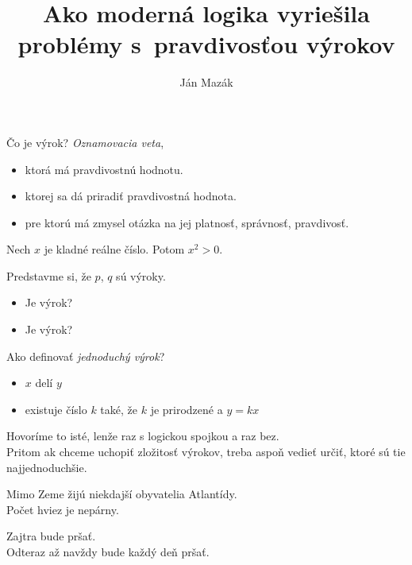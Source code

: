 \documentclass[12pt]{beamer}
\theoremstyle{definition}
\begin{document}
	\title{Ako moderná logika vyriešila problémy s~pravdivosťou výrokov}
	\author{Ján Mazák}
	\frame{\titlepage}

\begin{frame}
Čo je výrok? \emph{Oznamovacia veta},
\begin{itemize}
	\item ktorá má pravdivostnú hodnotu.
	\item ktorej sa dá priradiť pravdivostná hodnota.
	\item pre ktorú má zmysel otázka na jej platnosť, správnosť, pravdivosť.
\end{itemize}
\end{frame}

\begin{frame}
Nech $x$ je kladné reálne číslo. Potom $x^2 > 0$.
\end{frame}

\begin{frame}
Predstavme si, že $p$, $q$ sú výroky.
\begin{itemize}
	\item Je  výrok?
	\item Je  výrok?
\end{itemize}
\end{frame}

\begin{frame}
Ako definovať \emph{jednoduchý výrok}? 
\begin{itemize}
	\item $x$ delí $y$
	\item existuje číslo $k$ také, že $k$ je prirodzené a $y = kx$
\end{itemize}
Hovoríme to isté, lenže raz s logickou spojkou a raz bez.\\

Pritom ak chceme uchopiť zložitosť výrokov, treba aspoň vedieť určiť, ktoré sú tie najjednoduchšie.
\end{frame}

\begin{frame}
Mimo Zeme žijú niekdajší obyvatelia Atlantídy.\\[5mm]
Počet hviez je nepárny.
\end{frame}

\begin{frame}
Zajtra bude pršať.\\[5mm]
\pause
Odteraz až navždy bude každý deň pršať.
\end{frame}
\end{document}
